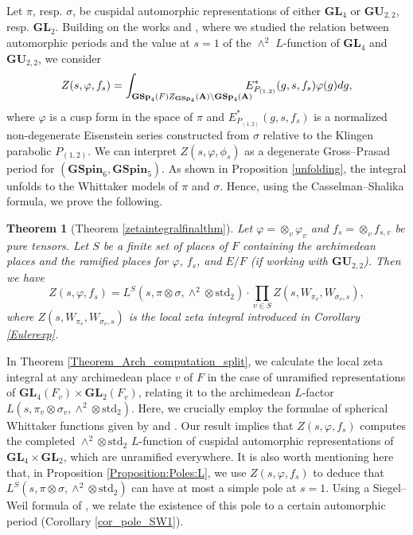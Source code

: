\documentclass[11pt, reqno]{amsart}
\theoremstyle{plain}
\theoremstyle{definition}
\theoremstyle{remark}
\theoremstyle{plain}
\newtheorem{thmc}[thma]{Theorem}
\def\A{{\bf A}}
\def\GSp{{\mathbf{GSp}}}
\def\GU{{\mathbf{GU}}}
\def\GL{\mathbf{GL}}
\begin{document}
Let $\pi$, resp. $\sigma$, be cuspidal automorphic representations of either $\GL_4$ or $\GU_{2,2}$, resp. $\GL_2$. Building on the works \cite{CauchiGutiMVI} and \cite{CauchiGuti}, where we studied the relation between automorphic periods and the value at $s=1$ of the $\wedge^2$ $L$-function of $\GL_4$ and $\GU_{2,2}$, we consider 
\[Z(s,\varphi,f_s) = \int_{\GSp_4(F) Z_{\GSp_4}(\A)\setminus \GSp_4(\A)} \!\!\!\!\!E^*_{P_{(1,2)}}(g,s, f_s)\varphi(g)dg,\]
where $\varphi$ is a cusp form in the space of $\pi$ and $E^*_{P_{(1,2)}}(g,s, f_s)$ is a normalized non-degenerate Eisenstein series constructed from $\sigma$ relative to the Klingen parabolic $P_{(1,2)}$. We can interpret $Z(s,\varphi,\phi_s)$ as a degenerate Gross--Prasad period for $(\mathbf{GSpin}_6,\mathbf{GSpin}_5)$. As shown in Proposition \ref{unfolding}, the integral unfolds to the Whittaker models of $\pi$ and $\sigma$. Hence, using the Casselman--Shalika formula, we prove the following. 


\begin{thmc}[Theorem \ref{zetaintegralfinalthm}]\label{Thmc}
    Let $\varphi = \otimes_v\varphi_v$ and $f_{s} = \otimes_v f_{s,v}$ be pure tensors. Let $S$ be a finite set of places of $F$ containing the archimedean places and the ramified places for $\varphi$, $f_s$, and $E/F$ (if working with $\GU_{2,2}$). Then we have
    \[Z(s,\varphi,f_s) = L^S(s,\pi \otimes \sigma, \wedge^2 \otimes  \mathrm{std}_2)\cdot\prod_{v\in S}Z(s,W_{\pi_v},W_{\sigma_v,s}),\]
    where $Z(s,W_{\pi_v},W_{\sigma_v,s})$ is the local zeta integral introduced in Corollary \ref{Eulerexp}. 
\end{thmc}

In Theorem \ref{Theorem_Arch_computation_split}, we calculate the local zeta integral at any archimedean place $v$ of $F$ in the case of unramified representations of $\GL_4(F_v) \times \GL_2(F_v)$, relating it to the archimedean $L$-factor $L(s,\pi_v \otimes \sigma_v, \wedge^2 \otimes  \mathrm{std}_2)$. Here, we crucially employ the formulae of spherical Whittaker functions given by \cite{IshiiStade} and \cite{IshiiMultivariate}. Our result implies that $Z(s,\varphi,f_s)$ computes the completed $\wedge^2 \otimes  \mathrm{std}_2$ $L$-function of cuspidal automorphic representations of $\GL_4 \times \GL_2$, which are unramified everywhere. It is also worth mentioning here that, in Proposition \ref{Proposition:Poles:L}, we use $Z(s,\varphi,f_s)$ to deduce that $L^S(s,\pi \otimes \sigma, \wedge^2 \otimes  \mathrm{std}_2)$ can have at most a simple pole at $s=1$. Using a  Siegel--Weil formula of \cite{KudlaRallis}, we relate the existence of this pole to a certain automorphic period (Corollary \ref{cor_pole_SW1}).
\end{document}
